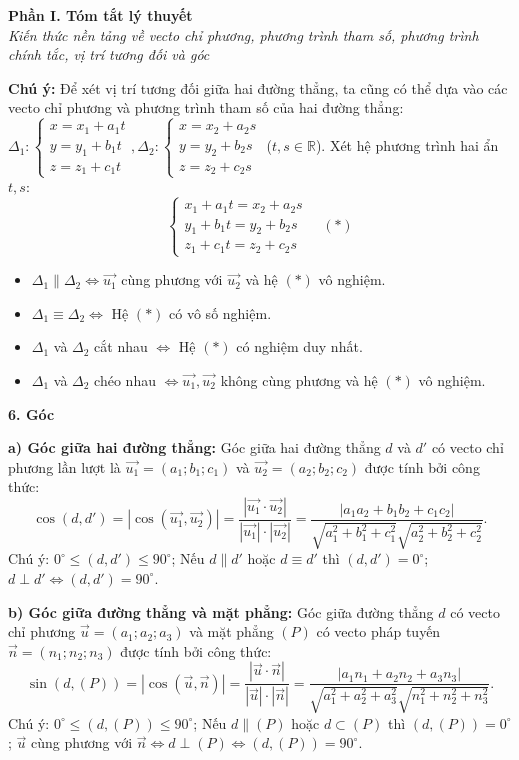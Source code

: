\documentclass[12pt,a4paper]{article}
\newenvironment{lesson}[2]{
	\vspace{1em}\noindent\textbf{\Large #1}\\
	\textit{#2}\vspace{0.5em}
}{}
\begin{document}
\begin{lesson}{Phần I. Tóm tắt lý thuyết}{Kiến thức nền tảng về vecto chỉ phương, phương trình tham số, phương trình chính tắc, vị trí tương đối và góc}
\textbf{Chú ý:} Để xét vị trí tương đối giữa hai đường thẳng, ta cũng có thể dựa vào các vecto chỉ phương và phương trình tham số của hai đường thẳng:
$\Delta_1: \begin{cases} x = x_1 + a_1t \\ y = y_1 + b_1t \\ z = z_1 + c_1t \end{cases}, \Delta_2: \begin{cases} x = x_2 + a_2s \\ y = y_2 + b_2s \\ z = z_2 + c_2s \end{cases}$ ($t, s \in \mathbb{R}$).
Xét hệ phương trình hai ẩn $t, s$:
$$\begin{cases} x_1 + a_1t = x_2 + a_2s \\ y_1 + b_1t = y_2 + b_2s \\ z_1 + c_1t = z_2 + c_2s \end{cases} \quad (*)$$
\begin{itemize}
    \item $\Delta_1 \parallel \Delta_2 \Leftrightarrow \vec{u_1}$ cùng phương với $\vec{u_2}$ và hệ $(*)$ vô nghiệm.
    \item $\Delta_1 \equiv \Delta_2 \Leftrightarrow$ Hệ $(*)$ có vô số nghiệm.
    \item $\Delta_1$ và $\Delta_2$ cắt nhau $\Leftrightarrow$ Hệ $(*)$ có nghiệm duy nhất.
    \item $\Delta_1$ và $\Delta_2$ chéo nhau $\Leftrightarrow \vec{u_1}, \vec{u_2}$ không cùng phương và hệ $(*)$ vô nghiệm.
\end{itemize}

\textbf{6. Góc}

\textbf{a) Góc giữa hai đường thẳng:}
Góc giữa hai đường thẳng $d$ và $d'$ có vecto chỉ phương lần lượt là $\vec{u_1} = (a_1; b_1; c_1)$ và $\vec{u_2} = (a_2; b_2; c_2)$ được tính bởi công thức:
$$\cos(d, d') = |\cos(\vec{u_1}, \vec{u_2})| = \frac{|\vec{u_1} \cdot \vec{u_2}|}{|\vec{u_1}| \cdot |\vec{u_2}|} = \frac{|a_1a_2 + b_1b_2 + c_1c_2|}{\sqrt{a_1^2 + b_1^2 + c_1^2}\sqrt{a_2^2 + b_2^2 + c_2^2}}.$$
Chú ý: $0^\circ \le (d, d') \le 90^\circ$; Nếu $d \parallel d'$ hoặc $d \equiv d'$ thì $(d, d') = 0^\circ$; $d \perp d' \Leftrightarrow (d, d') = 90^\circ$.

\textbf{b) Góc giữa đường thẳng và mặt phẳng:}
Góc giữa đường thẳng $d$ có vecto chỉ phương $\vec{u} = (a_1; a_2; a_3)$ và mặt phẳng $(P)$ có vecto pháp tuyến $\vec{n} = (n_1; n_2; n_3)$ được tính bởi công thức:
$$\sin(d, (P)) = |\cos(\vec{u}, \vec{n})| = \frac{|\vec{u} \cdot \vec{n}|}{|\vec{u}| \cdot |\vec{n}|} = \frac{|a_1n_1 + a_2n_2 + a_3n_3|}{\sqrt{a_1^2 + a_2^2 + a_3^2}\sqrt{n_1^2 + n_2^2 + n_3^2}}.$$
Chú ý: $0^\circ \le (d, (P)) \le 90^\circ$; Nếu $d \parallel (P)$ hoặc $d \subset (P)$ thì $(d, (P)) = 0^\circ$; $\vec{u}$ cùng phương với $\vec{n} \Leftrightarrow d \perp (P) \Leftrightarrow (d, (P)) = 90^\circ$.


\end{lesson}
\end{document}

